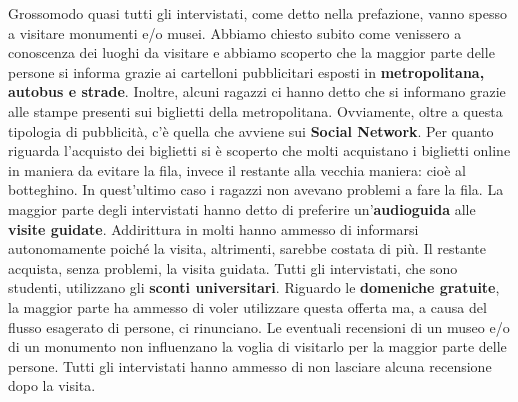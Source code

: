 Grossomodo quasi tutti gli intervistati, come detto nella prefazione, vanno spesso a visitare monumenti e/o musei. Abbiamo chiesto subito come venissero a conoscenza dei luoghi da visitare e abbiamo scoperto che la maggior parte delle persone si informa grazie ai cartelloni pubblicitari esposti in \textbf{metropolitana, autobus e strade}. Inoltre, alcuni ragazzi ci hanno detto che si informano grazie alle stampe presenti sui biglietti della metropolitana. Ovviamente, oltre a questa tipologia di pubblicità, c'è quella che avviene sui \textbf{Social Network}. 
\newline
Per quanto riguarda l'acquisto dei biglietti si è scoperto che molti acquistano i biglietti online in maniera da evitare la fila, invece il restante alla vecchia maniera: cioè al botteghino. In quest'ultimo caso i ragazzi non avevano problemi a fare la fila.
\newline
La maggior parte degli intervistati hanno detto di preferire un'\textbf{audioguida} alle \textbf{visite guidate}. Addirittura in molti hanno ammesso di informarsi autonomamente poiché la visita, altrimenti, sarebbe costata di più. Il restante acquista, senza problemi, la visita guidata.
\newline
Tutti gli intervistati, che sono studenti, utilizzano gli \textbf{sconti universitari}. Riguardo le \textbf{domeniche gratuite}, la maggior parte ha ammesso di voler utilizzare questa offerta ma, a causa del flusso esagerato di persone, ci rinunciano.
Le eventuali recensioni di un museo e/o di un monumento non influenzano  la voglia di visitarlo per la maggior parte delle persone. Tutti gli intervistati hanno ammesso di non lasciare alcuna recensione dopo la visita.

